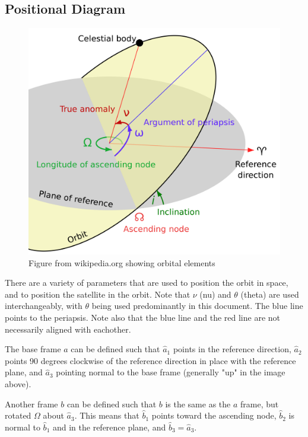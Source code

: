 \documentclass{article}
\begin{document}
\bigskip\bigskip
\subsection{Positional Diagram}
\begin{figure}[H]
    \centering
    \includegraphics[scale=0.1]{WikiImage}
    \caption{Figure from wikipedia.org showing orbital elements}\label{fig:Wiki Image}
\end{figure}
There are a variety of parameters that are used to position the orbit in space, and to position the satellite in the orbit. Note that $\nu$ (nu) and $\theta$ (theta) are used interchangeably, with $\theta$ being used predominantly in this document. The blue line points to the periapsis. Note also that the blue line and the red line are not necessarily aligned with eachother.

The base frame $a$ can be defined such that $\hat{a}_1$ points in the reference direction, $\hat{a}_2$ points 90 degrees clockwise of the reference direction in place with the reference plane, and $\hat{a}_3$ pointing normal to the base frame (generally "up" in the image above).

Another frame $b$ can be defined such that $b$ is the same as the $a$ frame, but rotated $\Omega$ about $\hat{a}_3$. This means that $\hat{b}_1$ points toward the ascending node, $\hat{b}_2$ is normal to $\hat{b}_1$ and in the reference plane, and $\hat{b}_3=\hat{a}_3$.
\end{document}
